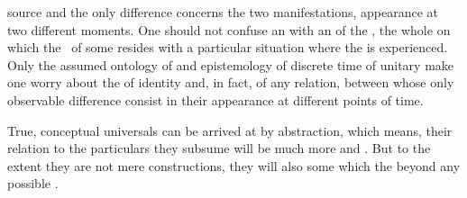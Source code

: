 source and the only difference concerns the two  manifestations,
appearance at two different moments. One should not confuse an 
with an   of the , the whole 
on which the \nexus\ of some  resides with a particular situation
where the  is experienced. Only the assumed ontology
of  and epistemology of discrete time of unitary
 make one worry about the  of identity and,
in fact, of any relation, between  whose only observable
difference consist in their appearance at different points of time.

True, conceptual universals can be arrived at by abstraction, which means, their
relation to the particulars they subsume will be much more  and
. But to the extent they are not mere  constructions,
they will also  some  which 
the  beyond any possible .

\newpa 

